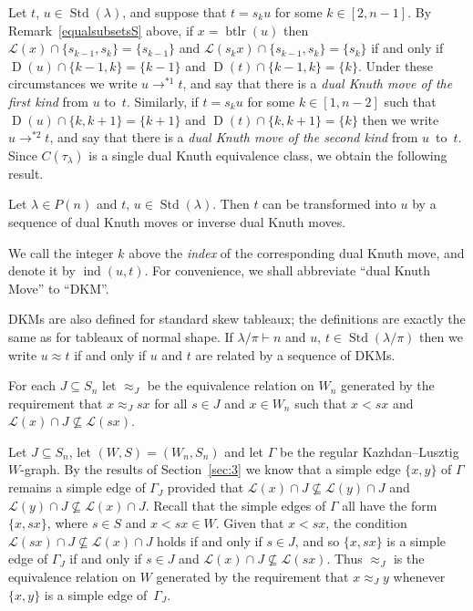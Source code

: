 \documentclass[ALCO,ThmDefs,Unicode,epreuves]{cedram}
\DeclareMathOperator{\word}{btlr}
\DeclareMathOperator{\STD}{Std}
\DeclareMathOperator{\ind}{ind}
\DeclareMathOperator{\D}{D}
\begin{document}
Let $t,\,u\in\STD(\lambda)$, and suppose that
$t = s_ku$ for some $k\in[2,n-1]$. By Remark~\ref{equalsubsetsS}
above, if $x=\word(u)$ then $\mathcal{L}(x)\cap\{s_{k-1},s_k\}=\{s_{k-1}\}$
and $\mathcal{L}(s_kx)\cap\{s_{k-1},s_k\}=\{s_k\}$ if and only
if $\D(u)\cap\{k-1,k\}=\{k-1\}$ and $\D(t)\cap\{k-1,k\}=\{k\}$.
Under these circumstances we write $u\to^{*1} t$, and say that there
is a \emph{dual Knuth move of the first kind} from $u$ to~$t$.
Similarly, if $t=s_ku$ for some $k\in[1,n-2]$ such that
$\D(u)\cap\{k,k+1\}=\{k+1\}$ and $ \D(t)\cap\{k,k+1\}=\{k\}$ then we
write $u\to^{*2}t$, and say that there is a \emph{dual Knuth
move of the second kind} from $u$~to~$t$.
Since $C(\tau_\lambda)$ is a single dual Knuth equivalence class,
we obtain the following result.

\begin{prop}\label{oneclass}
Let $\lambda\in P(n)$ and $t,\,u\in\STD(\lambda)$. Then $t$
can be transformed into $u$ by a sequence of dual Knuth moves or
inverse dual Knuth moves.
\end{prop}


We call the integer $k$ above the \emph{index} of the corresponding
dual Knuth move, and denote it by $\ind(u,t)$. For convenience, we shall
abbreviate ``dual Knuth Move'' to ``DKM''.

\begin{rema}
DKMs are also defined for standard skew tableaux; the definitions
are exactly the same as for tableaux of normal shape.
If $\lambda/\pi\vdash n$ and $u,\,t\in\STD(\lambda/\pi)$ then we
write $u\approx t$ if and only if $u$ and $t$ are related by a
sequence of DKMs.
\end{rema}
\begin{defi}\label{approxm-in-W}
For each $J\subseteq S_n$ let $\approx_J$ be the
equivalence relation on $W_n$ generated by the requirement that
$x\approx_J sx$ for all $s\in J$ and $x\in W_n$
such that $x<sx$ and $\mathcal L(x)\cap J\nsubseteq\mathcal L(sx)$.
\end{defi}

\begin{rema}\label{restriction-simple-edge}
Let $J\subseteq S_n$, let $(W,S)=(W_n,S_n)$ and let
$\Gamma$ be the regular Kazhdan--Lusztig $W$-graph. By the results of
Section~\ref{sec:3} we know that a simple
edge $\{x,y\}$ of $\Gamma$ remains a simple edge of
$\Gamma_J$ provided that
$\mathcal{L}(x)\cap J\nsubseteq\mathcal{L}(y)\cap J$ and
$\mathcal{L}(y)\cap J\nsubseteq\mathcal{L}(x)\cap J$. Recall that
the simple edges of $\Gamma$ all have the form $\{x,sx\}$, where
$s\in S$ and $x<sx\in W$. Given that $x<sx$, the condition
$\mathcal{L}(sx)\cap J\nsubseteq\mathcal{L}(x)\cap J$ holds if and
only if $s\in J$, and so $\{x,sx\}$ is a simple edge of
$\Gamma_J$ if and only if $s\in J$ and
$\mathcal L(x)\cap J\nsubseteq\mathcal L(sx)$. Thus $\approx_J$
is the equivalence relation on $W$ generated by the requirement
that $x\approx_J y$ whenever $\{x,y\}$ is a simple edge
of~$\Gamma_J$.
\end{rema}
\end{document}

